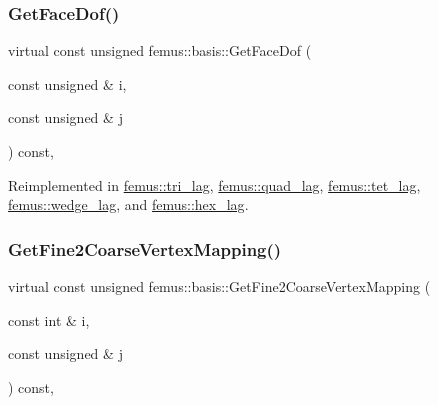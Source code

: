 \mbox{\label{classfemus_1_1basis_a06f93864b6ce0925d41bf08173dc2500}} 
\subsubsection{\texorpdfstring{Get\+Face\+Dof()}{GetFaceDof()}}
{\footnotesize\ttfamily virtual const unsigned femus\+::basis\+::\+Get\+Face\+Dof (\begin{DoxyParamCaption}\item[{const unsigned \&}]{i,  }\item[{const unsigned \&}]{j }\end{DoxyParamCaption}) const\hspace{0.3cm}{\ttfamily [inline]}, {\ttfamily [virtual]}}



Reimplemented in \mbox{\hyperlink{classfemus_1_1tri__lag_a1f53bf1823d6a1f1e593dc25df0fecc1}{femus\+::tri\+\_\+lag}}, \mbox{\hyperlink{classfemus_1_1quad__lag_aad6a7fa04e40018089716a27d78b434e}{femus\+::quad\+\_\+lag}}, \mbox{\hyperlink{classfemus_1_1tet__lag_a1d112ec062067cef9672bd1a3e726a5e}{femus\+::tet\+\_\+lag}}, \mbox{\hyperlink{classfemus_1_1wedge__lag_a3c027b9b1360d01725004434e89b671d}{femus\+::wedge\+\_\+lag}}, and \mbox{\hyperlink{classfemus_1_1hex__lag_a55c8cc6a3fa975cbc7a640c201ae2204}{femus\+::hex\+\_\+lag}}.

\mbox{\label{classfemus_1_1basis_a2ba867dcfa634c47f1c52caddd9bfdba}} 
\subsubsection{\texorpdfstring{Get\+Fine2\+Coarse\+Vertex\+Mapping()}{GetFine2CoarseVertexMapping()}}
{\footnotesize\ttfamily virtual const unsigned femus\+::basis\+::\+Get\+Fine2\+Coarse\+Vertex\+Mapping (\begin{DoxyParamCaption}\item[{const int \&}]{i,  }\item[{const unsigned \&}]{j }\end{DoxyParamCaption}) const\hspace{0.3cm}{\ttfamily [inline]}, {\ttfamily [virtual]}}



